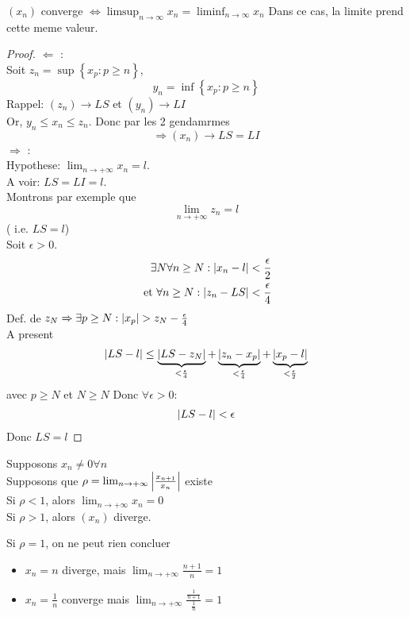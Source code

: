 \documentclass[../main.tex]{subfiles}
\begin{document}
\begin{thm}
	$(x_n)$ converge $\iff \limsup_{n \to  \infty } x_n = \liminf_{n \to \infty } x_n$ 
	Dans ce cas, la limite prend cette meme valeur.
\end{thm}
\begin{proof}
$\Leftarrow$ :\\
Soit $z_n= \sup \left\{ x_p: p \geq n \right\} $,
\[ 
y_n = \inf \left\{ x_p: p \geq n \right\} 
\]
Rappel: $(z_n) \to LS$ et $(y_n) \to LI$ \\
Or, $y_n \leq x_n \leq z_n$. Donc par les 2 gendamrmes
\[ 
	\Rightarrow ( x_n) \to LS = LI
\]
 $\Rightarrow$ :\\
 Hypothese: $\lim_{n \to  + \infty} x_n =l$.\\
 A voir: $LS = LI =l$.\\
 Montrons par exemple que 
 \[ 
 \lim_{n \to  + \infty} z_n = l
 \]
 ( i.e. $LS = l$)\\
 Soit $\epsilon > 0$.
 \begin{align*}
 \exists N \forall n \geq N: \left\vert x_n -l \right\vert < \frac{\epsilon}{2}\\
 \text{ et } \forall n \geq N: \left\vert z_n - LS\right\vert < \frac{\epsilon}{4}
 \end{align*}
 Def. de $z_N  \Rightarrow \exists p \geq N: \left\vert x_p\right\vert > z_N - \frac{\epsilon}{4} $\\
 A present 
 \[ 
	 \left\vert LS -l\right\vert \leq \underbrace{\left\vert LS -z_N\right\vert}_{< \frac{\epsilon}{4}} + \underbrace{\left\vert z_n -x_p\right\vert}_{< \frac{\epsilon}{4}} + \underbrace{\left\vert x_p -l\right\vert}_{< \frac{\epsilon}{2}}
 \]
 avec $p \geq N$ et $N \geq N$
 Donc $\forall \epsilon > 0:$ 
 \begin{align*}
	 \left\vert LS -l \right\vert < \epsilon
 \end{align*}
 Donc $LS =l$
\end{proof}
\begin{thm}\label{thm:premiere_regle_de_d_alembert}
	Supposons $x_n \neq 0 \forall n$ \\
	Supposons que $\rho = \lim_{n \to  + \infty} \left\vert \frac{x_{n+1} }{x_n} \right\vert$ existe\\
	Si $\rho< 1$, alors $\lim_{n \to  + \infty} x_n =0$ \\
	Si $\rho > 1$, alors $(x_n)$ diverge.
\end{thm}
\begin{rmq}
Si $\rho =1$, on ne peut rien concluer
\end{rmq}
\begin{exemple}
\begin{itemize}
\item $x_n = n$ diverge, mais $\lim_{n \to  + \infty} \frac{n+1}{n} = 1$
\item $x_n = \frac{1}{n}$ converge mais $\lim_{n \to  + \infty} \frac{\frac{1}{n+1}}{\frac{1}{n}}= 1$
\end{itemize}
\end{exemple}
\end{document}
